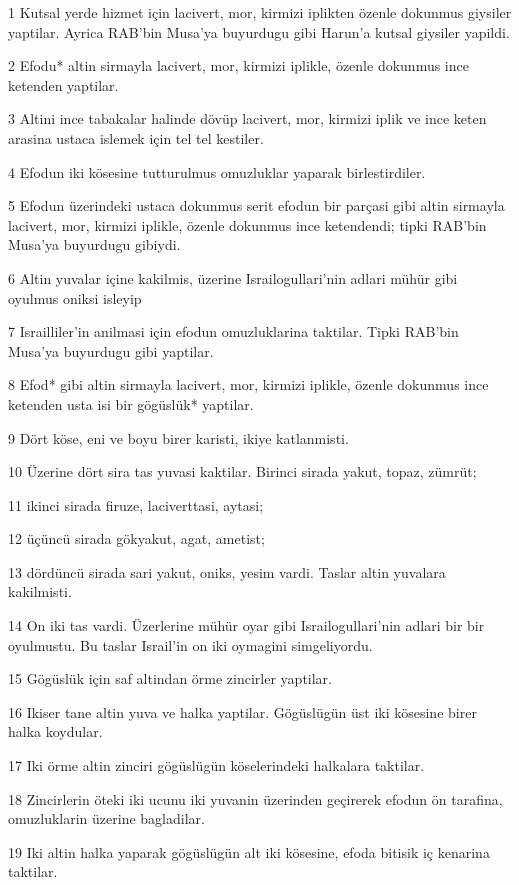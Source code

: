 \par 1 Kutsal yerde hizmet için lacivert, mor, kirmizi iplikten özenle dokunmus giysiler yaptilar. Ayrica RAB'bin Musa'ya buyurdugu gibi Harun'a kutsal giysiler yapildi.
\par 2 Efodu* altin sirmayla lacivert, mor, kirmizi iplikle, özenle dokunmus ince ketenden yaptilar.
\par 3 Altini ince tabakalar halinde dövüp lacivert, mor, kirmizi iplik ve ince keten arasina ustaca islemek için tel tel kestiler.
\par 4 Efodun iki kösesine tutturulmus omuzluklar yaparak birlestirdiler.
\par 5 Efodun üzerindeki ustaca dokunmus serit efodun bir parçasi gibi altin sirmayla lacivert, mor, kirmizi iplikle, özenle dokunmus ince ketendendi; tipki RAB'bin Musa'ya buyurdugu gibiydi.
\par 6 Altin yuvalar içine kakilmis, üzerine Israilogullari'nin adlari mühür gibi oyulmus oniksi isleyip
\par 7 Israilliler'in anilmasi için efodun omuzluklarina taktilar. Tipki RAB'bin Musa'ya buyurdugu gibi yaptilar.
\par 8 Efod* gibi altin sirmayla lacivert, mor, kirmizi iplikle, özenle dokunmus ince ketenden usta isi bir gögüslük* yaptilar.
\par 9 Dört köse, eni ve boyu birer karisti, ikiye katlanmisti.
\par 10 Üzerine dört sira tas yuvasi kaktilar. Birinci sirada yakut, topaz, zümrüt;
\par 11 ikinci sirada firuze, laciverttasi, aytasi;
\par 12 üçüncü sirada gökyakut, agat, ametist;
\par 13 dördüncü sirada sari yakut, oniks, yesim vardi. Taslar altin yuvalara kakilmisti.
\par 14 On iki tas vardi. Üzerlerine mühür oyar gibi Israilogullari'nin adlari bir bir oyulmustu. Bu taslar Israil'in on iki oymagini simgeliyordu.
\par 15 Gögüslük için saf altindan örme zincirler yaptilar.
\par 16 Ikiser tane altin yuva ve halka yaptilar. Gögüslügün üst iki kösesine birer halka koydular.
\par 17 Iki örme altin zinciri gögüslügün köselerindeki halkalara taktilar.
\par 18 Zincirlerin öteki iki ucunu iki yuvanin üzerinden geçirerek efodun ön tarafina, omuzluklarin üzerine bagladilar.
\par 19 Iki altin halka yaparak gögüslügün alt iki kösesine, efoda bitisik iç kenarina taktilar.
